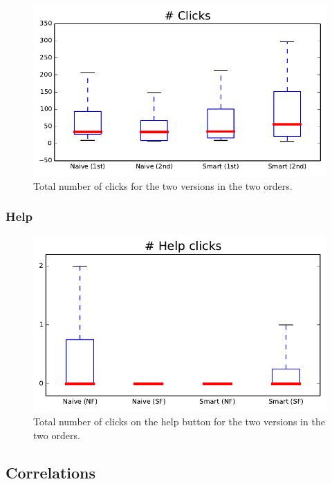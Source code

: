 \begin{figure}
\center
\includegraphics[width=.9\textwidth]{img/graphs/1a_04.pdf}
\caption{Total number of clicks for the two versions in the two orders.}
\end{figure}

\subsubsection{Help}
\nlipsum

\begin{figure}
\center
\includegraphics[width=.9\textwidth]{img/graphs/2_01.pdf}
\caption{Total number of clicks on the help button for the two versions in the two orders.}
\end{figure}

\subsection{Correlations}
\nlipsum

